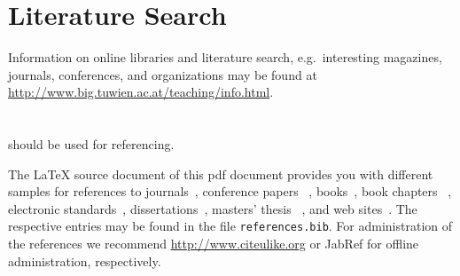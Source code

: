 \label{ch:bibliographic}

\section{Literature Search}

Information on online libraries and literature search, e.g.\ interesting
magazines, journals, conferences, and organizations may be found at
\url{http://www.big.tuwien.ac.at/teaching/info.html}.

\section{\BibTeX}

\BibTeX{} should be used for referencing.

The \LaTeX{} source document of this pdf document provides you with different
samples for references to journals~\cite{jour:B2BServices}, conference papers~
\cite{proc:TheWebMLApproach}, books~\cite{book:umlatwork}, book chapters~
\cite{incoll:ErhardKonrad1992}, electronic standards~\cite{man:BPEL},
dissertations~\cite{phdthesis:manuelWimmer}, masters' thesis~
\cite{mast:AUMLProfile}, and web sites~\cite{misc:BIGWebsite}.
The respective \BibTeX{} entries may be found in the file
\texttt{references.bib}.
For administration of the \BibTeX{} references we recommend
\url{http://www.citeulike.org} or JabRef for offline administration,
respectively.
